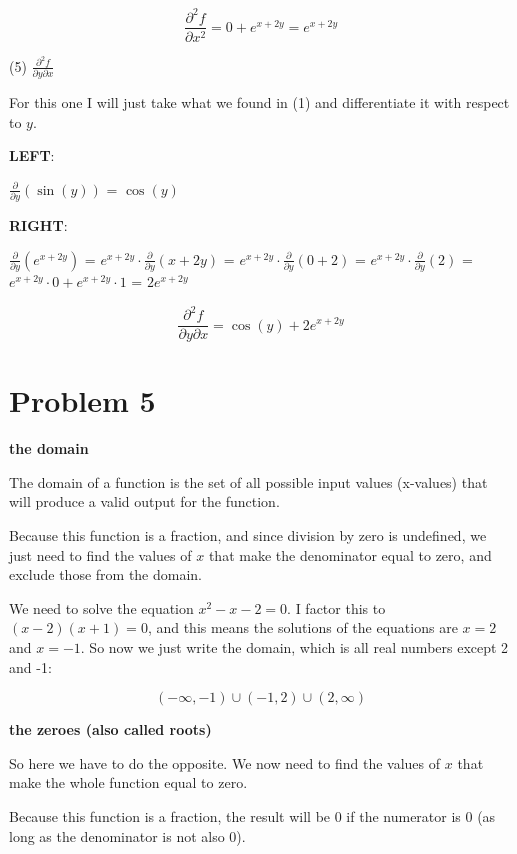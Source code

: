 \documentclass[11pt, a4paper]{article}
\begin{document}
\[
\frac{\partial^2 f}{\partial x^2} = 0 + e^{x+2y} = e^{x+2y}
\]




(5) $\frac{\partial^2 f}{\partial y \partial x}$

For this one I will just take what we found in (1) and differentiate it with respect to $y$.

\textbf{LEFT}:

$\frac{\partial}{\partial y}(\sin(y))$ = $\cos(y)$

\textbf{RIGHT}:

$\frac{\partial}{\partial y}(e^{x+2y})$ = $e^{x+2y} \cdot \frac{\partial}{\partial y}(x+2y)$ = $e^{x+2y} \cdot \frac{\partial}{\partial y}(0+2)$ = $e^{x+2y} \cdot \frac{\partial}{\partial y}(2)$ = $e^{x+2y} \cdot 0 + e^{x+2y} \cdot 1$ = $2e^{x+2y}$

\[
\frac{\partial^2 f}{\partial y \partial x} = \cos(y) + 2e^{x+2y}
\]







\pagebreak
\section*{Problem 5}


\textbf{the domain}

The domain of a function is the set of all possible input values (x-values) that will produce a valid output for the function.

Because this function is a fraction, and since division by zero is undefined, we just need to find the values of $x$ that make the denominator equal to zero, and exclude those from the domain.

We need to solve the equation $x^2 - x - 2 = 0$. I factor this to $(x - 2)(x + 1) = 0$, and this means the solutions of the equations are $x = 2$ and $x = -1$. So now we just write the domain, which is all real numbers except 2 and -1:

\[
(-\infty, -1) \cup (-1, 2) \cup (2, \infty)
\]

\textbf{the zeroes (also called roots)}

So here we have to do the opposite. We now need to find the values of $x$ that make the whole function equal to zero.

Because this function is a fraction, the result will be 0 if the numerator is 0 (as long as the denominator is not also 0).
\end{document}
